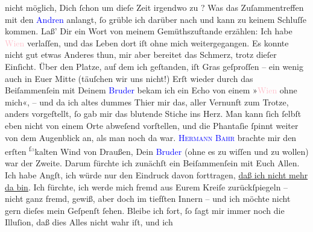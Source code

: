                nicht möglich, Dich ſchon um dieſe Zeit irgendwo zu \label{K_L02608-3v}\label{K_L02608-3h}?\pend
           \pstart
           Was das Zuſammentreffen mit den \textcolor{blue}{Andren}{} anlangt, ſo grüble ich darüber nach und kann zu
               keinem Schluſſe kommen. Laß’ Dir ein Wort von meinem Gemüthszuftande erzählen: Ich
               habe \textcolor{pink}{Wien}{}\ledrightnote{\textcolor{pink}{Wien}} verlaſſen, und das Leben dort iſt ohne mich
               weitergegangen. Es konnte nicht gut \strikeout{\textcolor{gray}{×}\textcolor{gray}{e}} etwas Anderes {\pb}thun, mir aber bereitet das Schmerz, trotz dieſer
               Einſicht. Über den Platze, auf dem ich geſtanden, iſt Gras geſproſſen – ein wenig
               auch in Euer Mitte (täuſchen wir uns nicht!) Erſt wieder durch das Beiſammenſein mit
               Deinem \textcolor{blue}{Bruder}{} bekam ich ein
               Echo von einem »\textcolor{pink}{Wien}{}\ledrightnote{\textcolor{pink}{Wien}} ohne mich«, – und da ich altes
               dummes Thier mir das, aller Vernunft zum Trotze, anders vorgeſtellt, ſo  gab mir das blutende Stiche ins Herz. Man kann {\pb}ſich ſelbſt eben nicht von einem Orte abweſend
               vorſtellen, und die Phantaſie ſpinnt weiter von dem Augenblick an, als man noch da
               war. \textsc{\textcolor{blue}{Hermann Bahr}{}\ledrightnote{\textcolor{blue}{Hermann Bahr}}}
               brachte mir den erſten \substVorne{}\textsuperscript{ſ\textcolor{gray}{a}}\substDazwischen{}ka\substHinten{}lten Wind von Draußen, Dein \textcolor{blue}{Bruder}{} (ohne es zu wiſſen und zu wollen) war der Zweite. Darum fürchte ich
               zunächſt ein Beiſammenſein mit Euch Allen. Ich habe Angſt, ich würde nur den Eindruck
               davon forttragen, \uline{daß ich nicht mehr da bin}. Ich
               fürchte, ich werde mich fremd aus Eurem Kreiſe zurückſpiegeln – nicht ganz fremd,
               gewiß, {\pb}aber doch im tiefſten Innern – und ich
               möchte nicht gern \introOben{}dieſes\introOben{} mein Geſpenſt ſehen. Bleibe ich
               fort, ſo ſagt mir immer noch die Illuſion, daß dies Alles nicht wahr iſt, und ich
